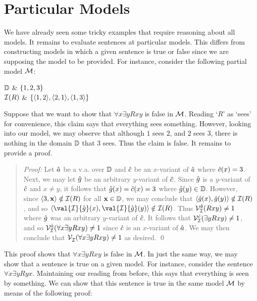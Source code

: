 \section{Particular Models}
  \label{sec:ParticularModels}

We have already seen some tricky examples that require reasoning about all models.
It remains to evaluate sentences at particular models.
This differs from constructing models in which a given sentence is true or false since we are supposing the model to be provided.
For instance, consider the following partial model $\mathcal{M}$:

\begin{partialmodel}
	$\mathbb{D}$			& $\lbrace1,2,3\rbrace$ \\
	$\mathcal{I}(R)$	  & $\lbrace\langle1,2\rangle,\langle2,1\rangle,\langle1,3\rangle\rbrace$ \\
\end{partialmodel}

Suppose that we want to show that $\forall x\exists y Rxy$ is false in $\mathcal{M}$.
Reading `$R$' as `sees' for convenience, this claim says that everything sees something.
However, looking into our model, we may observe that although $1$ sees $2$, and $2$ sees $3$, there is nothing in the domain $\mathbb{D}$ that $3$ sees.
Thus the claim is false.
It remains to provide a proof.

\begin{quote}
\label{somemodel1}
  \textit{Proof:}
  Let $\hat{a}$ be a v.a. over $\mathbb{D}$ and $\hat{c}$ be an $x$-variant of $\hat{a}$ where $\hat{c}(x)=3$.
  Next, we may let $\hat{g}$ be an arbitrary $y$-variant of $\hat{c}$.
  Since $\hat{g}$ is a $y$-variant of $\hat{c}$ and $x\neq y$, it follows that $\hat{g}(x)=\hat{c}(x)=3$ where $\hat{g}(y)\in\mathbb{D}$.
  However, since $\langle3,\mathbf{x}\rangle\notin\mathcal{I}(R)$ for all $\mathbf{x}\in\mathbb{D}$, we may conclude that $\langle\hat{g}(x),\hat{g}(y)\rangle\notin\mathcal{I}(R)$, and so $\tuple{\val{\I}{\va{g}}(x),\val{\I}{\va{g}}(y)}\notin\I(R)$. 
  Thus $\mathcal{V}_{\mathcal{I}}^{\hat{g}}(Rxy)\neq 1$ where $\hat{g}$ was an arbitrary $y$-variant of $\hat{c}$.
  It follows that $\mathcal{V}_{\mathcal{I}}^{\hat{c}}(\exists yRxy)\neq 1$, and so $\mathcal{V}_{\mathcal{I}}^{\hat{a}}(\forall x\exists yRxy)\neq 1$ since $\hat{c}$ is an $x$-variant of $\hat{a}$.
  We may then conclude that $\mathcal{V}_{\mathcal{I}}^{}(\forall x\exists yRxy)\neq 1$ as desired. 
  \qed
\end{quote}

This proof shows that $\forall x\exists y Rxy$ is false in $\mathcal{M}$.
In just the same way, we may show that a sentence is true on a given model.
For instance, consider the sentence $\forall x\exists y Ryx$.
Maintaining our reading from before, this says that everything is seen by something.
We can show that this sentence is true in the same model $\mathcal{M}$ by means of the following proof: 
	

